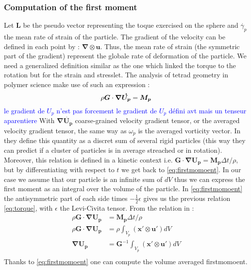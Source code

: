 \documentclass[10pt,a4paper,openany]{article}
\theoremstyle{mytheoremstyle}
\theoremstyle{mytheoremstyle}
\theoremstyle{myproblemstyle}
\begin{document}
\subsubsection*{Computation of the first moment} 
Let $\bm{L}$ be the pseudo vector representing the toque exercised on the sphere and $\dot{\gamma_p}$ the mean rate of strain of the particle.
The gradient of the velocity can be defined in each point by : $\bm{\nabla \otimes u}$.
Thus, the mean rate of strain (the symmetric part of the gradient) represent the globale rate of deformation of the particle.
We need a generalized definition similar as the one which linked the torque to the rotation but for the strain and stresslet.
The analysis of tetrad geometry in polymer science \citep{Pumir2013}\citep{willen2019resolved} make use of such an expression :
\begin{equation}
    \rho\bm{G} \cdot \bm{\nabla \dot{U_p}} = \bm{M_p} \\
    \label{eq:firstmomoent}
\end{equation}
\textcolor{blue}{le gradient de $U_p$ n'est pas forcement le gradient de $U_p$ défini avt mais un tenseur aparentiere}
With $\bm{\nabla \dot{U_p}}$ coarse-grained velocity gradient tensor, or the averaged velocity gradient tensor, the same way as $\omega_p$ is the averaged vorticity vector.
In \citet{Pumir2013} they define this quantity as a discret sum of several rigid particles (this way they can predict if a cluster of particles is in average streached or in rotation). 
Moreover, this relation is defined in a kinetic context i.e. $\bm{G} \cdot \bm{\nabla U_p} = \bm{M_p}\Delta t /\rho$, but by differentiating with respect to $t$ we get back to \ref{eq:firstmomoent}. 
In our case we assume that our particle is an infinite sum of $dV$ thus we can express the first moment as an integral over the volume of the particle. 
In \ref{eq:firstmomoent} the antisymmetric part of each side times $-\frac{1}{2}\epsilon$ gives us the previous relation \ref{eq:torque}, with $\epsilon$ the Levi-Civita tensor. 
From the relation in \citet{Pumir2013} :
\begin{align*}
    \rho\bm{G} \cdot \bm{\nabla U_p} &= \bm{M_p}\Delta t /\rho \\
    \rho\bm{G} \cdot \bm{\nabla U_p} &= \rho \int_{V_p} \left(\bm{x'}\otimes\bm{u'}\right)dV \\
    \bm{\nabla U_p} &= \bm{G}^{-1}  \int_{V_p} \left(\bm{x'}\otimes\bm{u' }\right)dV \\
\end{align*} 
Thanks to \ref{eq:firstmomoent} one can compute the volume averaged firstmomoent. 
\end{document}
